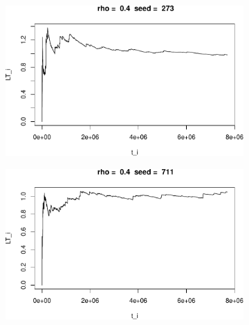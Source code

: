 \documentclass[]{article}
\begin{document}
\begin{figure}[h!]
\begin{subfigure}[b]{.55\linewidth}
\includegraphics[width=\linewidth]{003_files/figure-latex/unnamed-chunk-13-5.pdf}
\end{subfigure}\hfill
\begin{subfigure}[b]{.55\linewidth}
\includegraphics[width=\linewidth]{003_files/figure-latex/unnamed-chunk-13-6.pdf}
\end{subfigure}\vfill
\end{figure}
\end{document}
